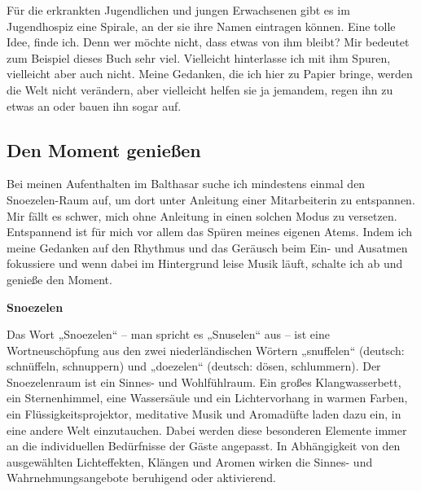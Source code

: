 \documentclass[fontsize=14pt,a4paper,headinclude,DIV=calc,automark]{scrbook}
\begin{document}
Für die erkrankten Jugendlichen und jungen Erwachsenen gibt es im Jugendhospiz eine Spirale, an der sie ihre Namen eintragen können. Eine tolle Idee, finde ich. Denn wer möchte nicht, dass etwas von ihm bleibt? Mir bedeutet zum Beispiel dieses Buch sehr viel. Vielleicht hinterlasse ich mit ihm Spuren, vielleicht aber auch nicht. Meine Gedanken, die ich hier zu Papier bringe, werden die Welt nicht verändern, aber vielleicht helfen sie ja jemandem, regen ihn zu etwas an oder bauen ihn sogar auf.

\subsection{Den Moment genießen}

Bei meinen Aufenthalten im Balthasar suche ich mindestens einmal den Snoezelen-Raum auf, um dort unter Anleitung einer Mitarbeiterin zu entspannen. Mir fällt es schwer, mich ohne Anleitung in einen solchen Modus zu versetzen. Entspannend ist für mich vor allem das Spüren meines eigenen Atems. Indem ich meine Gedanken auf den Rhythmus und das Geräusch beim Ein- und Ausatmen fokussiere und wenn dabei im Hintergrund leise Musik läuft, schalte ich ab und genieße den Moment.

\begin{tcolorbox}[
    enhanced,
    breakable,
    colframe=rahmenlinie,      %
    colback=white,             %
    left=12pt, right=12pt,     %
    top=12pt, bottom=12pt,     %
    boxrule=0.3pt,             %
    arc=8pt                    %
]
\small\sffamily
\setlength{\parindent}{0pt} %

\textbf{Snoezelen}

\vspace{0.5\baselineskip}

Das Wort „Snoezelen“ – man spricht es „Snuselen“ aus – ist eine Wortneuschöpfung aus den zwei niederländischen Wörtern „snuffelen“ (deutsch: schnüffeln, schnuppern) und „doezelen“ (deutsch: dösen, schlummern). Der Snoezelenraum ist ein Sinnes- und Wohlfühlraum. Ein großes Klangwasserbett, ein Sternenhimmel, eine Wassersäule und ein Lichtervorhang in warmen Farben, ein Flüssigkeitsprojektor, meditative Musik und Aromadüfte laden dazu ein, in eine andere Welt einzutauchen. Dabei werden diese besonderen Elemente immer an die individuellen Bedürfnisse der Gäste angepasst. In Abhängigkeit von den ausgewählten Lichteffekten, Klängen und Aromen wirken die Sinnes- und Wahrnehmungsangebote beruhigend oder aktivierend.

\end{tcolorbox}
\end{document}
